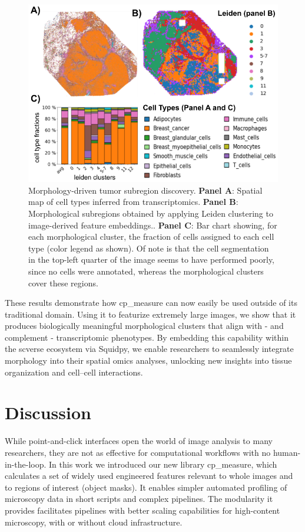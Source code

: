 \documentclass{article}
\begin{document}
\begin{figure}[htbp]
\centering
\includegraphics[width=.99\linewidth]{./figs/fig_4_spatial.png}
\caption{\label{fig:spatial_omics}{}Morphology-driven tumor subregion discovery. \textbf{Panel A}: Spatial map of cell types inferred from transcriptomics. \textbf{Panel B}: Morphological subregions obtained by applying Leiden clustering to image-derived feature embeddings.. \textbf{Panel C}: Bar chart showing, for each morphological cluster, the fraction of cells assigned to each cell type (color legend as shown). Of note is that the cell segmentation in the top-left quarter of the image seems to have performed poorly, since no cells were annotated, whereas the morphological clusters cover these regions.}
\end{figure}

These results demonstrate how cp\_measure can now easily be used outside of its traditional domain. Using it to featurize extremely large images, we show that it produces biologically meaningful morphological clusters that align with - and complement - transcriptomic phenotypes. By embedding this capability within the scverse ecosystem via Squidpy, we enable researchers to seamlessly integrate morphology into their spatial omics analyses, unlocking new insights into tissue organization and cell–cell interactions.


\section{Discussion}
\label{sec:orgf37b369}
While point-and-click interfaces open the world of image analysis to many researchers, they are not as effective for computational workflows with no human-in-the-loop. In this work we introduced our new library cp\_measure, which calculates a set of widely used engineered features relevant to whole images and to regions of interest (object masks). It enables simpler automated profiling of microscopy data in short scripts and complex pipelines. The modularity it provides facilitates pipelines with better scaling capabilities for high-content microscopy, with or without cloud infrastructure.
\end{document}
